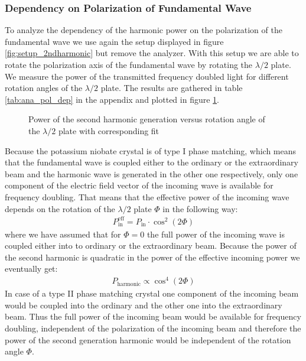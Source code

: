 \documentclass{protokoll_en}
\begin{document}
\subsubsection{Dependency on Polarization of Fundamental Wave}
\label{subsubsec:ana_pol_dep}
To analyze the dependency of the harmonic power on the polarization of the fundamental wave we use again the setup displayed in figure \ref{fig:setup_2ndharmonic} but remove the analyzer. With this setup we are able to rotate the polarization axis of the fundamental wave by rotating the $\lambda / 2$ plate. We measure the power of the transmitted frequency doubled light for different rotation angles of the $\lambda / 2$ plate. The results are gathered in table \ref{tab:ana_pol_dep} in the appendix and plotted in figure \ref{fig:ana_pol_dep}.
\begin{figure}[H]
  \resizebox{0.8\textwidth}{!}{
     
}
  \caption{Power of the second harmonic generation versus rotation angle of the $\lambda / 2$ plate with corresponding fit}
  \label{fig:ana_pol_dep}
\end{figure}
Because the potassium niobate crystal is of type I phase matching, which means that the fundamental wave is coupled either to the ordinary or the extraordinary beam and the harmonic wave is generated in the other one respectively, only one component of the electric field vector of the incoming wave is available for frequency doubling. That means that the effective power of the incoming wave depends on the rotation of the $\lambda / 2$ plate $\Phi$ in the following way:
\begin{align*}
P_\textrm{in}^\textrm{eff}=P_\textrm{in} \cdotp \cos^2\left(2\Phi\right)
\end{align*}
where we have assumed that for $\Phi = 0$ the full power of the incoming wave is coupled either into to ordinary or the extraordinary beam. Because the power of the second harmonic is quadratic in the power of the effective incoming power we eventually get:
\begin{align}
\label{eq:ana_type1}
P_\textrm{harmonic}\propto \cos^4\left(2\Phi\right)
\end{align}
In case of a type II phase matching crystal one component of the incoming beam would be coupled into the ordinary and the other one into the extraordinary beam. Thus the full power of the incoming beam would be available for frequency doubling, independent of the polarization of the incoming beam and therefore the power of the second generation harmonic would be independent of the rotation angle $\Phi$.
\end{document}
